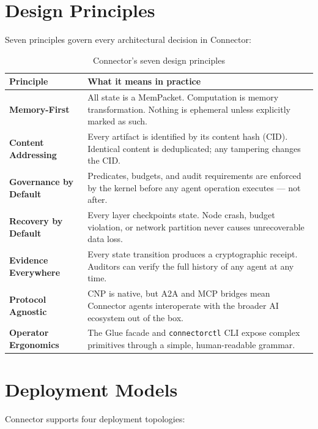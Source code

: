 \section{Design Principles}

Seven principles govern every architectural decision in Connector:

\begin{table}[H]
\centering
\renewcommand{\arraystretch}{1.4}
\begin{tabularx}{\textwidth}{@{}lX@{}}
\toprule
\textbf{Principle} & \textbf{What it means in practice} \\
\midrule
\textbf{Memory-First} &
  All state is a MemPacket. Computation is memory transformation.
  Nothing is ephemeral unless explicitly marked as such. \\
\textbf{Content Addressing} &
  Every artifact is identified by its content hash (CID).
  Identical content is deduplicated; any tampering changes the CID. \\
\textbf{Governance by Default} &
  Predicates, budgets, and audit requirements are enforced by the kernel
  before any agent operation executes — not after. \\
\textbf{Recovery by Default} &
  Every layer checkpoints state. Node crash, budget violation, or network
  partition never causes unrecoverable data loss. \\
\textbf{Evidence Everywhere} &
  Every state transition produces a cryptographic receipt.
  Auditors can verify the full history of any agent at any time. \\
\textbf{Protocol Agnostic} &
  CNP is native, but A2A and MCP bridges mean Connector agents
  interoperate with the broader AI ecosystem out of the box. \\
\textbf{Operator Ergonomics} &
  The Glue facade and \texttt{connectorctl} CLI expose complex primitives
  through a simple, human-readable grammar. \\
\bottomrule
\end{tabularx}
\caption{Connector's seven design principles}
\end{table}

\section{Deployment Models}

Connector supports four deployment topologies:

